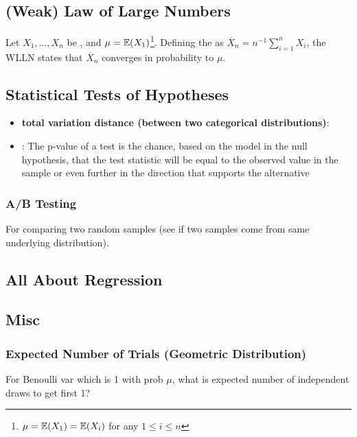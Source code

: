 \documentclass[11pt]{article}
\begin{document}
\subsection{(Weak) Law of Large Numbers}
Let $X_1, \dots, X_n$ be , and $\mu = \mathbb{E}(X_1)$\footnote{$\mu = \mathbb{E}(X_1) =
  \mathbb{E}(X_i)$ for any $1 \leq i \leq n$}. Defining the  as
$\overline{X}_n = n^{-1} \sum_{i=1}^n X_i$, the WLLN states that $\overline{X}_n$
converges in probability to $\mu$. 


\subsection{Statistical Tests of Hypotheses}

\begin{itemize}
  \item \textbf{total variation distance (between two categorical distributions)}:
  \item {}: The p-value of a test is the chance, based on the model in the
  null hypothesis, that the test statistic will be equal to the observed value in the
  sample or even further in the direction that supports the alternative


\end{itemize}

\subsubsection{A/B Testing}
For comparing two random samples (see if two samples come from same underlying
distribution).  



\subsection{All About Regression}


\subsection{Misc}

\subsubsection{Expected Number of Trials (Geometric Distribution)}
For Benoulli var which is 1 with prob $\mu$, what is expected number of independent draws
to get first 1?
\end{document}
